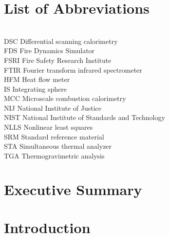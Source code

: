 \documentclass[12pt,oneside]{book}
\begin{document}
\chapter*{List of Abbreviations}

\begin{tabbing}
\hspace{1.5in} \= \\
DSC 	\> Differential scanning calorimetry \\
FDS	    \> Fire Dynamics Simulator \\
FSRI    \> Fire Safety Research Institute \\
FTIR 	\> Fourier transform infrared spectrometer \\
HFM 	\> Heat flow meter \\
IS 		\> Integrating sphere \\
MCC 	\> Microscale combustion calorimetry \\
NIJ 	\> National Institute of Justice \\
NIST    \> National Institute of Standards and Technology \\
NLLS    \> Nonlinear least squares \\
SRM 	\> Standard reference material \\
STA 	\> Simultaneous thermal analyzer \\
TGA 	\> Thermogravimetric analysis \\
\end{tabbing}

\newpage
\chapter*{Executive Summary}
\label{chap:executive_summary}
\setcounter{page}{1}

\newpage
\mainmatter
\newpage

\chapter{Introduction}
\label{sec:introduction}
\end{document}
